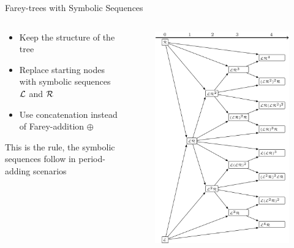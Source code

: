 \begin{frame}{Farey-trees with Symbolic Sequences}
	\begin{columns}
		\begin{column}{.5 \textwidth}
			\begin{itemize}
				\item Keep the structure of the tree
				\item Replace starting nodes with symbolic sequences $\mathcal{L}$ and $\mathcal{R}$
				\item Use concatenation instead of Farey-addition $\oplus$
			\end{itemize}
			\pause
			\vspace{2em}
			This is the rule, the symbolic sequences follow in period-adding scenarios
		\end{column}
		\begin{column}{.5 \textwidth}
			\vspace{-3em}
			\begin{figure}
				\includegraphics[width=.6 \textwidth]{../../Report/Figures/FareyTrees/LR/adding.png}
			\end{figure}
		\end{column}
	\end{columns}
\end{frame}

